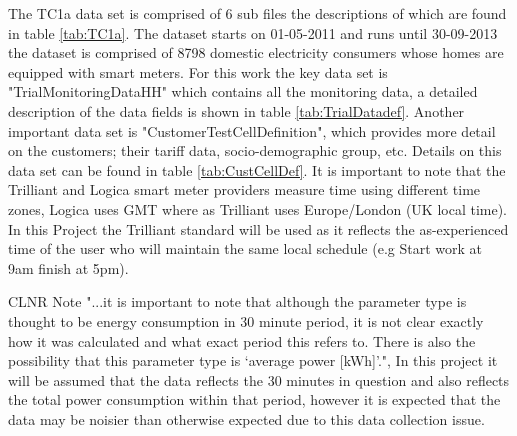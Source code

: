 The TC1a data set is comprised of 6 sub files the descriptions of which are found in table \ref{tab:TC1a}.  The dataset starts on 01-05-2011 and runs until 30-09-2013 the dataset is comprised of 8798 domestic electricity consumers whose homes are equipped with smart meters. For this work the key data set is "TrialMonitoringDataHH" which contains all the monitoring data, a detailed description of the data fields is shown in table \ref{tab:TrialDatadef}. Another important data set is "CustomerTestCellDefinition", which provides more detail on the customers; their tariff data, socio-demographic group, etc. Details on this data set can be found in table \ref{tab:CustCellDef}. It is important to note that the Trilliant and Logica smart meter providers measure time using different time zones, Logica uses GMT where as Trilliant uses Europe/London (UK local time). In this Project the Trilliant standard will be used as it reflects the as-experienced time of the user who will maintain the same local schedule (e.g Start work at 9am finish at 5pm). 

CLNR Note "...it is important to note that although the parameter type is thought to be energy consumption in 30 minute period, it is not clear exactly how it was calculated and what exact period this refers to. There is also the possibility that this parameter type is ‘average power [kWh]’.", In this project it will be assumed that the data reflects the 30 minutes in question and also reflects the total power consumption within that period, however it is expected that the data may be noisier than otherwise expected due to this data collection issue.

\begin{table}
\centering
{}
\caption{Description of the files in the TC1a dataset}
\label{tab:TC1a}
\end{table}


